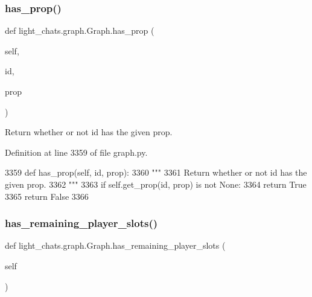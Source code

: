 \subsubsection{\texorpdfstring{has\+\_\+prop()}{has\_prop()}}
{\footnotesize\ttfamily def light\+\_\+chats.\+graph.\+Graph.\+has\+\_\+prop (\begin{DoxyParamCaption}\item[{}]{self,  }\item[{}]{id,  }\item[{}]{prop }\end{DoxyParamCaption})}

\begin{DoxyVerb}Return whether or not id has the given prop.
\end{DoxyVerb}
 

Definition at line 3359 of file graph.\+py.


\begin{DoxyCode}
3359     \textcolor{keyword}{def }has\_prop(self, id, prop):
3360         \textcolor{stringliteral}{"""}
3361 \textcolor{stringliteral}{        Return whether or not id has the given prop.}
3362 \textcolor{stringliteral}{        """}
3363         \textcolor{keywordflow}{if} self.get\_prop(id, prop) \textcolor{keywordflow}{is} \textcolor{keywordflow}{not} \textcolor{keywordtype}{None}:
3364             \textcolor{keywordflow}{return} \textcolor{keyword}{True}
3365         \textcolor{keywordflow}{return} \textcolor{keyword}{False}
3366 
\end{DoxyCode}
\mbox{\label{classlight__chats_1_1graph_1_1Graph_a43ff743c3d16850dc7d68d809c88c97d}} 
\subsubsection{\texorpdfstring{has\+\_\+remaining\+\_\+player\+\_\+slots()}{has\_remaining\_player\_slots()}}
{\footnotesize\ttfamily def light\+\_\+chats.\+graph.\+Graph.\+has\+\_\+remaining\+\_\+player\+\_\+slots (\begin{DoxyParamCaption}\item[{}]{self }\end{DoxyParamCaption})}

